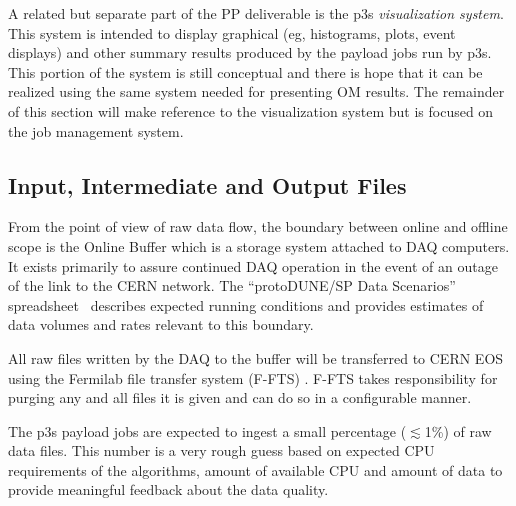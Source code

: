 \documentclass[pdftex,12pt,letter]{article}
\newcommand{\pd}{protoDUNE\xspace}
\begin{document}
A related but separate part of the PP deliverable is the p3s
\textit{visualization system}.  This system is intended to display
graphical (eg, histograms, plots, event displays) and other summary
results produced by the payload jobs run by p3s.  This portion of the
system is still conceptual and there is hope that it can be realized
using the same system needed for presenting OM results.  The remainder
of this section will make reference to the visualization system but is
focused on the job management system.


\subsection{Input, Intermediate and Output Files}
\label{sec:io}

From the point of view of raw data flow, the boundary between online
and offline scope is the Online Buffer which is a storage system
attached to DAQ computers.  It exists primarily to assure continued
DAQ operation in the event of an outage of the link to the CERN
network.  The ``\pd/SP Data Scenarios'' spreadsheet~\cite{docdb1086}
describes expected running conditions and provides estimates of data
volumes and rates relevant to this boundary.

All raw files written by the DAQ to the buffer will be transferred to
CERN EOS using the Fermilab file transfer system (F-FTS)
\cite{docdb1212,fts}.  F-FTS takes responsibility for purging any and
all files it is given and can do so in a configurable manner.

The p3s payload jobs are expected to ingest a small percentage
($\lesssim$1\%) of raw data files.  This number is a very rough guess
based on expected CPU requirements of the algorithms, amount of
available CPU and amount of data to provide meaningful feedback about
the data quality.
\end{document}
